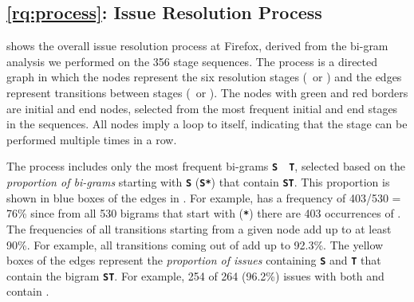 


\subsection{\ref{rq:process}: Issue Resolution Process}
\label{sub:results_process}

 shows the overall issue resolution process at Firefox, derived from the bi-gram analysis we performed on the 356 stage sequences. The process is a directed graph in which the nodes represent the six resolution stages (\eg~\impl or \impls) and the edges represent transitions between stages (\eg~\impl \trs \crv or \impls \trs \crvs). The nodes with  \colorbox{StateGreen}{green} and \colorbox{StateRed}{red} borders are initial and end nodes, selected from the most frequent initial and end stages in the sequences. All nodes imply a loop to itself, indicating that the stage can be performed multiple times in a row.

The process includes only the most frequent bi-grams \texttt{\textbf{S}}~\trs~\texttt{\textbf{T}}, selected based on the \textit{proportion of bi-grams} starting with \texttt{\textbf{S}} (\texttt{\textbf{S}}\trs \texttt{\textbf{*}}) that contain \texttt{\textbf{S}}\trs \texttt{\textbf{T}}. This proportion is shown in \colorbox{BoxesBlue}{blue boxes} of the edges in . For example, \impls  \trs \crvs has a frequency of 403/530 =  \colorbox{BoxesBlue}{76\%} since  from all 530 bigrams that start with \impls (\impls \trs \texttt{\textbf{*}}) there are 403 occurrences of \impls  \trs \crvs. The frequencies of all transitions starting from a given node add up to at least 90\%. For example, all transitions coming out of \impls add up to 92.3\%. The \colorbox{BoxesYellow}{yellow boxes} of the edges represent the \textit{proportion of issues} containing \texttt{\textbf{S}} and \texttt{\textbf{T}} that contain the bigram \texttt{\textbf{S}}\trs\texttt{\textbf{T}}. For example, 254 of 264 (\colorbox{BoxesYellow}{96.2\%}) issues with both \impls and \crvs contain \impls \trs \crvs.


